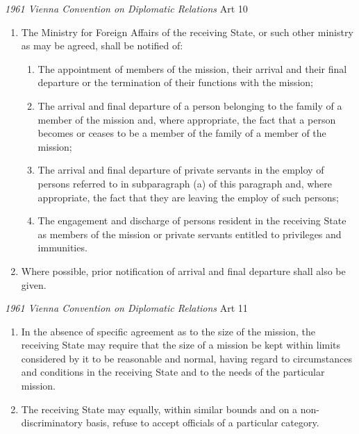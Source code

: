\begin{conventiondetails}{\textit{1961 Vienna Convention on Diplomatic Relations} Art 10}
    \flushleft
    \begin{enumerate}
        \item The Ministry for Foreign Affairs of the receiving State, or such other ministry as may be agreed, shall be notified of:
        \begin{enumerate}
            \item The appointment of members of the mission, their arrival and their final departure or the termination of their functions with the mission;
            \item The arrival and final departure of a person belonging to the family of a member of the mission and, where appropriate, the fact that a person becomes or ceases to be a member of the family of a member of the mission;
            \item The arrival and final departure of private servants in the employ of persons referred to in subparagraph (a) of this paragraph and, where appropriate, the fact that they are leaving the employ of such persons;
            \item The engagement and discharge of persons resident in the receiving State as members of the mission or private servants entitled to privileges and immunities.
        \end{enumerate}
        \item Where possible, prior notification of arrival and final departure shall also be given.
    \end{enumerate}
\end{conventiondetails}

\begin{conventiondetails}{\textit{1961 Vienna Convention on Diplomatic Relations} Art 11}
    \flushleft
    \begin{enumerate}
        \item In the absence of specific agreement as to the size of the mission, the receiving State may require that the size of a mission be kept within limits considered by it to be reasonable and normal, having regard to circumstances and conditions in the receiving State and to the needs of the particular mission.
        \item The receiving State may equally, within similar bounds and on a non-discriminatory basis, refuse to accept officials of a particular category.
    \end{enumerate}
\end{conventiondetails}

